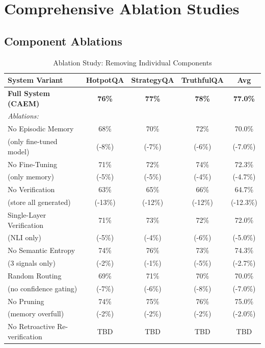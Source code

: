 \documentclass[12pt,a4paper]{article}
\theoremstyle{definition}
\begin{document}
\newpage

\section{Comprehensive Ablation Studies}

\subsection{Component Ablations}

\begin{table}[htbp]
\centering
\caption{Ablation Study: Removing Individual Components}
\small
\begin{tabular}{lcccc}
\toprule
\textbf{System Variant} & \textbf{HotpotQA} & \textbf{StrategyQA} & \textbf{TruthfulQA} & \textbf{Avg} \\
\midrule
\textbf{Full System (CAEM)} & \textbf{76\%} & \textbf{77\%} & \textbf{78\%} & \textbf{77.0\%} \\
\midrule
\textit{Ablations:} & & & & \\
No Episodic Memory & 68\% & 70\% & 72\% & 70.0\% \\
\quad (only fine-tuned model) & (-8\%) & (-7\%) & (-6\%) & (-7.0\%) \\
\midrule
No Fine-Tuning & 71\% & 72\% & 74\% & 72.3\% \\
\quad (only memory) & (-5\%) & (-5\%) & (-4\%) & (-4.7\%) \\
\midrule
No Verification & 63\% & 65\% & 66\% & 64.7\% \\
\quad (store all generated) & (-13\%) & (-12\%) & (-12\%) & (-12.3\%) \\
\midrule
Single-Layer Verification & 71\% & 73\% & 72\% & 72.0\% \\
\quad (NLI only) & (-5\%) & (-4\%) & (-6\%) & (-5.0\%) \\
\midrule
No Semantic Entropy & 74\% & 76\% & 73\% & 74.3\% \\
\quad (3 signals only) & (-2\%) & (-1\%) & (-5\%) & (-2.7\%) \\
\midrule
Random Routing & 69\% & 71\% & 70\% & 70.0\% \\
\quad (no confidence gating) & (-7\%) & (-6\%) & (-8\%) & (-7.0\%) \\
\midrule
No Pruning & 74\% & 75\% & 76\% & 75.0\% \\
\quad (memory overfull) & (-2\%) & (-2\%) & (-2\%) & (-2.0\%) \\
\midrule
No Retroactive Re-verification & TBD & TBD & TBD & TBD \\

\end{tabular}
\end{table}
\end{document}
